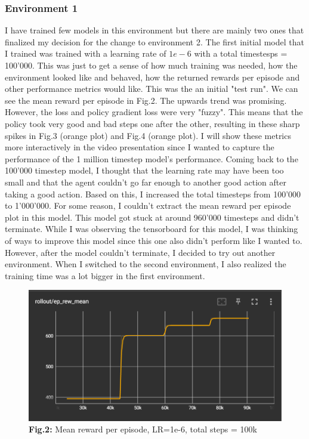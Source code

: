 \documentclass{article}
\numberwithin{equation}{section}
\numberwithin{equation}{section}
\begin{document}
\subsubsection*{Environment 1}
I have trained few models in this environment but there are mainly two ones that finalized my decision for the change to environment 2. The first initial model that I trained was trained with a learning rate of $1e-6$ with a total timestesps = 100'000. This was just to get a sense of how much training was needed, how the environment looked like and behaved, how the returned rewards per episode and other performance metrics would like. This was the an initial "test run". We can see the mean reward per episode in Fig.2. The upwards trend was promising. However, the loss and policy gradient loss were very "fuzzy". This means that the policy took very good and bad steps one after the other, resulting in these sharp spikes in Fig.3 (orange plot) and Fig.4 (orange plot). I will show these metrics more interactively in the video presentation since I wanted to capture the performance of the 1 million timestep model's performance. Coming back to the 100'000 timestep model, I thought that the learning rate may have been too small and that the agent couldn't go far enough to another good action after taking a good action. Based on this, I increased the total timesteps from 100'000 to 1'000'000. For some reason, I couldn't extract the mean reward per episode plot in this model. This model got stuck at around 960'000 timesteps and didn't terminate. While I was observing the tensorboard for this model, I was thinking of ways to improve this model since this one also didn't perform like I wanted to. However, after the model couldn't terminate, I decided to try out another environment. When I switched to the second environment, I also realized the training time was a lot bigger in the first environment.  



\begin{figure}[H]
	\centering
\includegraphics[width=\linewidth]{reward_env1.png}
	\\	
	\vspace{0.1in}
	\textbf{Fig.2:} Mean reward per episode, LR=1e-6, total steps = 100k
	\\
	\label{fig:Fig.3}
\end{figure}
\end{document}
